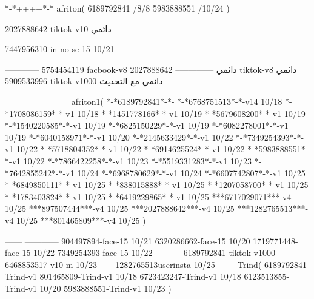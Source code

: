 *-*++++*-*
afriton(
6189792841 /8/8
5983888551 /10/24
)

2027888642 tiktok-v10
دائمي


7447956310-in-no-se-15 10/21

------------
5754454119 facbook-v8
دائمي
--------------
2027888642 tiktok-v8
دائمي
5909533996 tiktok-v1000
دائمي مع التحديث

__________
afriton1(
*-*6189792841*-*-
*-*6768751513*-*-v14 10/18
*-*1708086159*-*-v1 10/18
*-*1451778166*-*-v1 10/19
*-*5679608200*-*-v1 10/19
*-*1540220585*-*-v1 10/19
*-*6825150229*-*-v1 10/19
*-*6082278001*-*-v1 10/19
*-*6040158971*-*-v1 10/20
*-*2145633429*-*-v1 10/22
*-*7349254393*-*-v1 10/22
*-*5718804352*-*-v1 10/22
*-*6914625524*-*-v1 10/22
*-*5983888551*-*-v1 10/22
*-*7866422258*-*-v1 10/23
*-*5519331283*-*-v1 10/23
*-*7642855242*-*-v1 10/24
*-*6968780629*-*-v1 10/24
*-*6607742807*-*-v1 10/25
*-*6849850111*-*-v1 10/25
*-*838015888*-*-v1 10/25
*-*1207058700*-*-v1 10/25
*-*1783403824*-*-v1 10/25
*-*6419229865*-*-v1 10/25
***6717029071***-v4 10/25
***897507444***-v4 10/25
***2027888642***-v4 10/25
***1282765513***-v4 10/25
***801465809***-v4 10/25
)

------
------------
904497894-face-15 10/21
6320286662-face-15 10/20
1719771448-face-15 10/22
7349254393-face-15 10/22
---------
6189792841 tiktok-v1000
------
6468853517-v10-m 10/23
-----
1282765513userinsta 10/25
------
Trind(
6189792841-Trind-v1 
801465809-Trind-v1 10/18
6723423247-Trind-v1 10/18
6123513855-Trind-v1 10/20
5983888551-Trind-v1 10/23
)
